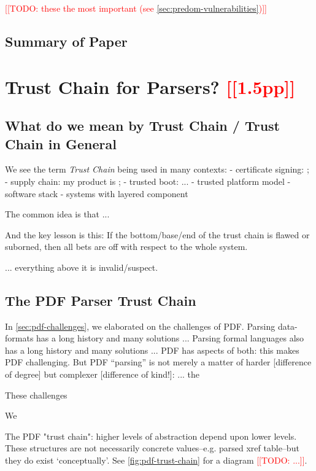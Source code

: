 \documentclass[conference,12pt]{IEEEtran}
\newcommand{\note}[1]{\noteYes{#1}}
\newcommand{\noteYes}[1]{\textcolor{red}{[[#1]]}}
\newcommand{\todo}[1]{\note{TODO: #1}}
\begin{document}
\todo{these the most important (see \cref{sec:predom-vulnerabilities})}


\subsection{Summary of Paper}
      
\section{Trust Chain for Parsers? \note{1.5pp}}
\label{sec:trustchain}

\subsection{What do we mean by Trust Chain / Trust Chain in General}

We see the term \emph{Trust Chain} being used in many contexts:
- certificate signing: ;
- supply chain: my product is ;
- trusted boot: ...
- trusted platform model
- software stack
- systems with layered component

The common idea is that ...

And the key lesson is this: If the bottom/base/end of the trust chain 
is flawed or suborned, then all bets are off with respect to the whole
system.

... everything above it is invalid/suspect.

\subsection{The PDF Parser Trust Chain}

In \cref{sec:pdf-challenges}, we elaborated on the challenges of PDF.
Parsing data-formats has a long history and many solutions ...
Parsing formal languages also has a long history and many solutions ...
PDF has aspects of both: this makes PDF challenging.
But PDF ``parsing'' is not merely a matter of harder [difference of degree]
but complexer [difference of kind!]:
  ... the 

These challenges 

We 

The PDF "trust chain": higher levels of abstraction depend upon lower levels.
These structures are not necessarily concrete values--e.g. parsed xref table--but they do exist `conceptually'.
See \cref{fig:pdf-trust-chain} for a diagram \todo{...}.
\end{document}
